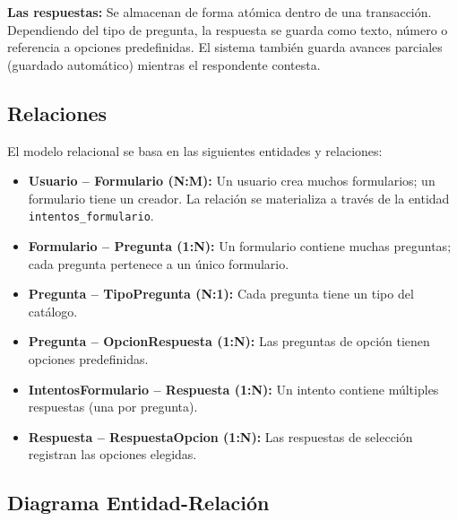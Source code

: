 \documentclass[12pt,a4paper]{article}
\begin{document}
\textbf{Las respuestas:}
Se almacenan de forma atómica dentro de una transacción. Dependiendo del tipo de pregunta, la respuesta se guarda como texto, número o referencia a opciones predefinidas. El sistema también guarda avances parciales (guardado automático) mientras el respondente contesta.

\subsection{Relaciones}

El modelo relacional se basa en las siguientes entidades y relaciones:

\begin{itemize}
  \item \textbf{Usuario -- Formulario (N:M):} Un usuario crea muchos formularios; un formulario tiene un creador. La relación se materializa a través de la entidad \texttt{intentos\_formulario}.
  \item \textbf{Formulario -- Pregunta (1:N):} Un formulario contiene muchas preguntas; cada pregunta pertenece a un único formulario.
  \item \textbf{Pregunta -- TipoPregunta (N:1):} Cada pregunta tiene un tipo del catálogo.
  \item \textbf{Pregunta -- OpcionRespuesta (1:N):} Las preguntas de opción tienen opciones predefinidas.
  \item \textbf{IntentosFormulario -- Respuesta (1:N):} Un intento contiene múltiples respuestas (una por pregunta).
  \item \textbf{Respuesta -- RespuestaOpcion (1:N):} Las respuestas de selección registran las opciones elegidas.
\end{itemize}

\subsection{Diagrama Entidad-Relación}
\end{document}
